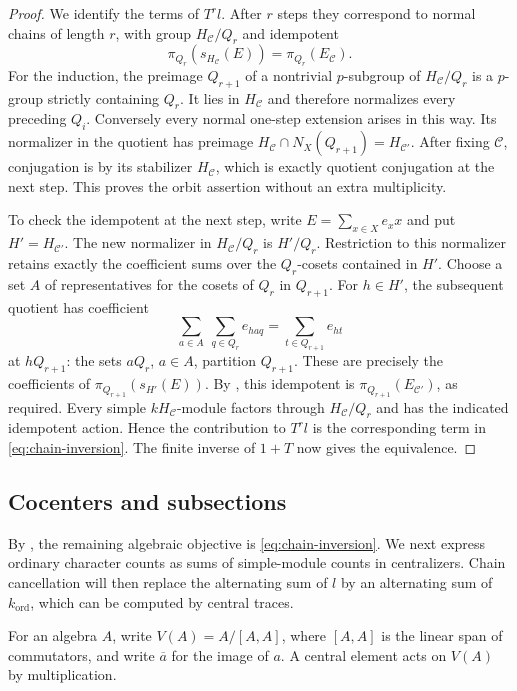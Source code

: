 \begin{proof}
We identify the terms of $T^r l$. After $r$ steps they correspond
to normal chains of length $r$, with group
$H_{\mathcal C}/Q_r$ and idempotent
\[
 \pi_{Q_r}(s_{H_{\mathcal C}}(E))
   =\pi_{Q_r}(E_{\mathcal C}).
\]
For the induction, the preimage $Q_{r+1}$ of a nontrivial
$p$-subgroup of $H_{\mathcal C}/Q_r$ is a $p$-group strictly
containing $Q_r$. It lies in $H_{\mathcal C}$ and therefore
normalizes every preceding $Q_i$. Conversely every normal one-step
extension arises in this way. Its normalizer in the quotient has
preimage
$H_{\mathcal C}\cap N_X(Q_{r+1})=H_{\mathcal C'}$.
After fixing $\mathcal C$, conjugation is by its stabilizer
$H_{\mathcal C}$, which is exactly quotient conjugation at the next
step. This proves the orbit assertion without an extra multiplicity.

To check the idempotent at the next step, write
$E=\sum_{x\in X}e_xx$ and put $H'=H_{\mathcal C'}$.
The new normalizer in $H_{\mathcal C}/Q_r$ is $H'/Q_r$.
Restriction to this normalizer retains exactly the coefficient sums
over the $Q_r$-cosets contained in $H'$. Choose a set $A$ of
representatives for the cosets of $Q_r$ in $Q_{r+1}$. For $h\in H'$,
the subsequent quotient has coefficient
\[
 \sum_{a\in A}\ \sum_{q\in Q_r}e_{haq}
     =\sum_{t\in Q_{r+1}}e_{ht}
\]
at $hQ_{r+1}$: the sets $aQ_r$, $a\in A$, partition $Q_{r+1}$.
These are precisely the coefficients of
$\pi_{Q_{r+1}}(s_{H'}(E))$.
By , this idempotent is
$\pi_{Q_{r+1}}(E_{\mathcal C'})$, as required.
Every simple $kH_{\mathcal C}$-module factors through
$H_{\mathcal C}/Q_r$ and has the indicated idempotent action.
Hence the contribution to $T^rl$ is the corresponding term in
\eqref{eq:chain-inversion}. The finite inverse of $1+T$ now gives
the equivalence.
\end{proof}

\subsection{Cocenters and subsections}

By , the remaining algebraic objective is
\eqref{eq:chain-inversion}. We next express ordinary character counts
as sums of simple-module counts in centralizers. Chain cancellation
will then replace the alternating sum of $l$ by an alternating sum of
$k_{\mathrm{ord}}$, which can be computed by central traces.

For an algebra $A$, write $V(A)=A/[A,A]$, where $[A,A]$ is the
linear span of commutators, and write $\overline a$ for the image of
$a$. A central element acts on $V(A)$ by multiplication.

